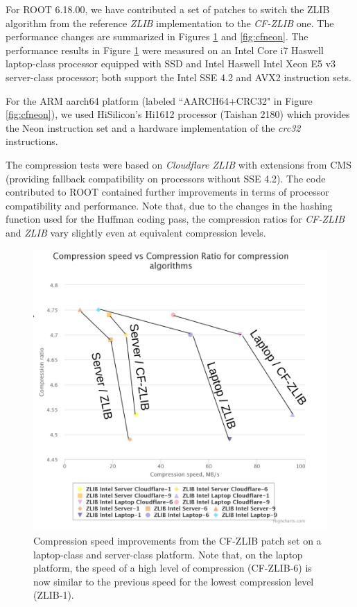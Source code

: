 \documentclass[12pt]{iopart}
\begin{document}
For ROOT 6.18.00, we have contributed a set of patches to switch the ZLIB algorithm from  the reference \textit{ZLIB} implementation to the \textit{CF-ZLIB} one.  The performance changes are summarized in Figures \ref{fig:cflaptop} and \ref{fig:cfneon}. The performance results in Figure \ref{fig:cflaptop} were measured on an Intel Core  i7 Haswell laptop-class processor equipped with SSD and Intel Haswell  Intel Xeon E5 v3 server-class processor; both support the Intel SSE 4.2 and AVX2 instruction sets.
 
For the ARM aarch64 platform (labeled ``AARCH64+CRC32" in Figure \ref{fig:cfneon}), we used HiSilicon's Hi1612 processor (Taishan 2180) which provides the Neon instruction set and a hardware implementation of the \textit{crc32} instructions.

The compression tests were based on \textit{Cloudflare ZLIB} \cite{zlib-cf-sources} with extensions from CMS \cite{zlib-cf-cms} (providing fallback compatibility on processors without SSE 4.2).  The code contributed to ROOT contained further improvements in terms of processor compatibility and performance.  Note that, due to the changes in the hashing function used for the Huffman coding pass, the compression ratios for \textit{CF-ZLIB} and \textit{ZLIB} vary slightly even at equivalent compression levels.

\begin{figure}[!ht]
\centering
\includegraphics[width=0.7\linewidth]{acat21.png}
\caption{Compression speed improvements from the CF-ZLIB patch set on a laptop-class and server-class platform.  Note that, on the laptop platform, the speed of a high level of compression (CF-ZLIB-6) is now similar to the previous speed for the lowest compression level (ZLIB-1). }
\label{fig:cflaptop}
\end{figure}
\end{document}
